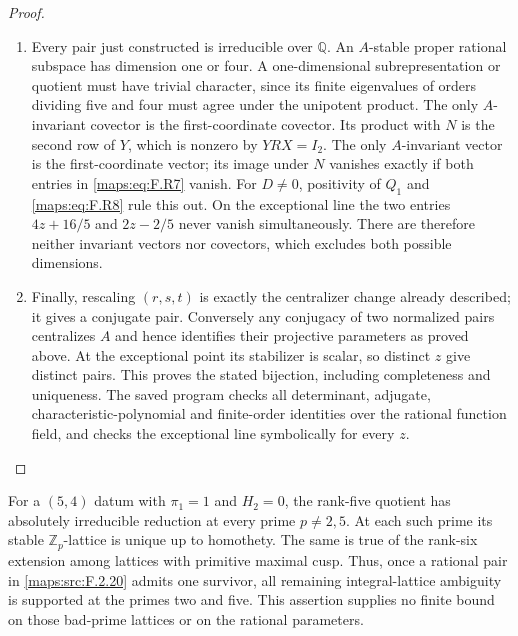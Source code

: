 \begin{proof}
\begin{enumerate}[label=\arabic*.]
\item Every pair just constructed is irreducible over $\mathbb Q$.
An $A$-stable proper rational subspace has dimension one or
four.  A one-dimensional subrepresentation or quotient must
have trivial character, since its finite eigenvalues of
orders dividing five and four must agree under the
unipotent product.  The only $A$-invariant covector is the
first-coordinate covector.  Its product with $N$ is the
second row of $Y$, which is nonzero by $YRX=I_2$.
The only $A$-invariant vector is the first-coordinate vector;
its image under $N$ vanishes exactly if both entries in
\eqref{maps:eq:F.R7} vanish.  For $D\ne0$, positivity of $Q_1$ and
\eqref{maps:eq:F.R8} rule this out.  On the exceptional line the two
entries $4z+16/5$ and $2z-2/5$ never vanish simultaneously.
There are therefore neither invariant vectors nor covectors,
which excludes both possible dimensions.

\item Finally, rescaling $(r,s,t)$ is exactly the centralizer
change already described; it gives a conjugate pair.
Conversely any conjugacy of two normalized pairs centralizes
$A$ and hence identifies their projective parameters as proved
above.  At the exceptional point its stabilizer is scalar,
so distinct $z$ give distinct pairs.  This proves the stated
bijection, including completeness and uniqueness.
The saved program checks all determinant, adjugate,
characteristic-polynomial and finite-order identities over
the rational function field, and checks the exceptional
line symbolically for every $z$.

\end{enumerate}
\end{proof}




\begin{corollary}\label{maps:src:F.2.21}


For a $(5,4)$ datum with $\pi_1=1$ and $H_2=0$, the
rank-five quotient has absolutely irreducible reduction
at every prime $p\ne2,5$.  At each such prime its stable
$\mathbb Z_p$-lattice is unique up to homothety.
The same is true of the rank-six extension among lattices
with primitive maximal cusp.  Thus, once a rational pair
in \ref{maps:src:F.2.20} admits one survivor, all remaining integral-lattice
ambiguity is supported at the primes two and five.
This assertion supplies no finite bound on those bad-prime
lattices or on the rational parameters.

\end{corollary}


